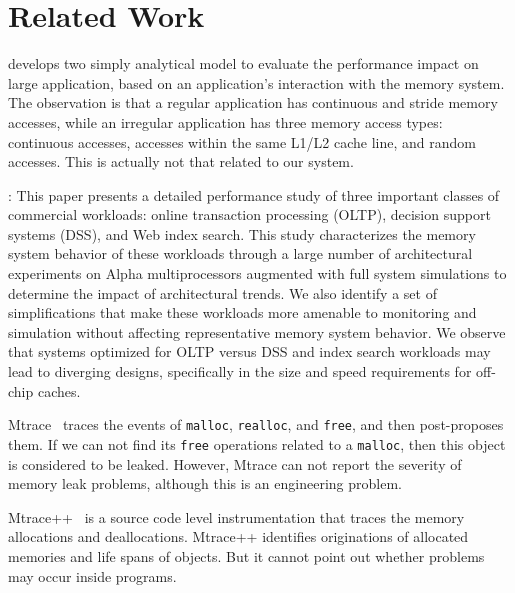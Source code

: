 \section{Related Work}

\cite{1291361} develops two simply analytical model to evaluate the performance impact on large application, based on an application's interaction with the memory system. The observation is that a regular application has continuous and stride memory accesses, while an irregular application has three memory access types: continuous accesses, accesses within the same L1/L2 cache line, and random accesses. This is actually not that related to our system. 


\cite{Barroso:1998:MSC:279358.279363}: This paper presents a detailed performance study of three important classes of commercial workloads: online transaction processing (OLTP), decision support systems (DSS), and Web index search.  This study characterizes the memory system behavior of these workloads through a large number of architectural experiments on Alpha multiprocessors augmented with full system simulations to determine the impact of architectural trends. We also identify a set of simplifications that make these workloads more amenable to monitoring and simulation without affecting representative memory system behavior. We observe that systems optimized for OLTP versus DSS and index search workloads may lead to diverging designs, specifically in the size and speed requirements for off-chip caches.

Mtrace~\cite{mtrace} traces the events of \texttt{malloc}, \texttt{realloc}, and \texttt{free}, and then post-proposes them. If we can not find its \texttt{free} operations related to a \texttt{malloc}, then this object is considered to be leaked. However, Mtrace can not report the severity of memory leak problems, although this is an engineering problem.    

Mtrace++~\cite{Lee:2000:DMM:786772.787150} is a source code level instrumentation that traces the memory allocations and deallocations. Mtrace++ identifies originations of allocated memories and life spans of objects. But it cannot point out whether problems may occur inside programs. 

